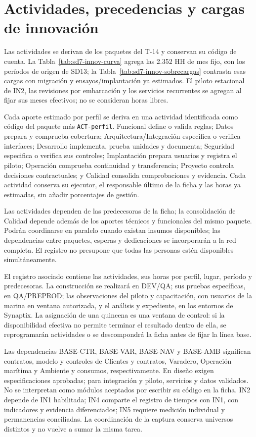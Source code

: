 \section{Actividades, precedencias y cargas de innovación}
Las actividades se derivan de los paquetes del T-14 y conservan su código de cuenta. La Tabla~\ref{tab:sd7-innov-curva} agrega las 2.352 HH de mes fijo, con los períodos de origen de SD13; la Tabla~\ref{tab:sd7-innov-sobrecargas} contrasta esas cargas con migración y ensayos/implantación ya estimados. El piloto estacional de IN2, las revisiones por embarcación y los servicios recurrentes se agregan al fijar sus meses efectivos; no se consideran horas libres.

Cada aporte estimado por perfil se deriva en una actividad identificada como código del paquete más \texttt{ACT-perfil}. Funcional define o valida reglas; Datos prepara y comprueba cobertura; Arquitectura/Integración especifica o verifica interfaces; Desarrollo implementa, prueba unidades y documenta; Seguridad especifica o verifica sus controles; Implantación prepara usuarios y registra el piloto; Operación comprueba continuidad y transferencia; Proyecto controla decisiones contractuales; y Calidad consolida comprobaciones y evidencia. Cada actividad conserva su ejecutor, el responsable último de la ficha y las horas ya estimadas, sin añadir porcentajes de gestión.

Las actividades dependen de las predecesoras de la ficha; la consolidación de Calidad depende además de los aportes técnicos y funcionales del mismo paquete. Podrán coordinarse en paralelo cuando existan insumos disponibles; las dependencias entre paquetes, esperas y dedicaciones se incorporarán a la red completa. El registro no presupone que todas las personas estén disponibles simultáneamente.

El registro asociado  contiene las actividades, sus horas por perfil, lugar, período y predecesoras. La construcción se realizará en DEV/QA; sus pruebas específicas, en QA/PREPROD; las observaciones del piloto y capacitación, con usuarios de la marina en ventana autorizada, y el análisis y expediente, en los entornos de Synaptix. La asignación de una quincena es una ventana de control: si la disponibilidad efectiva no permite terminar el resultado dentro de ella, se reprogramarán actividades o se descompondrá la ficha antes de fijar la línea base.

Las dependencias BASE-CTR, BASE-VAR, BASE-NAV y BASE-AMB significan contratos, modelo y controles de Clientes y contratos, Varadero, Operación marítima y Ambiente y consumos, respectivamente. En diseño exigen especificaciones aprobadas; para integración y piloto, servicios y datos validados. No se interpretan como módulos aceptados por escribir su código en la ficha. IN2 depende de IN1 habilitada; IN4 comparte el registro de tiempos con IN1, con indicadores y evidencia diferenciados; IN5 requiere medición individual y permanencias conciliadas. La coordinación de la captura conserva universos distintos y no vuelve a sumar la misma tarea.


